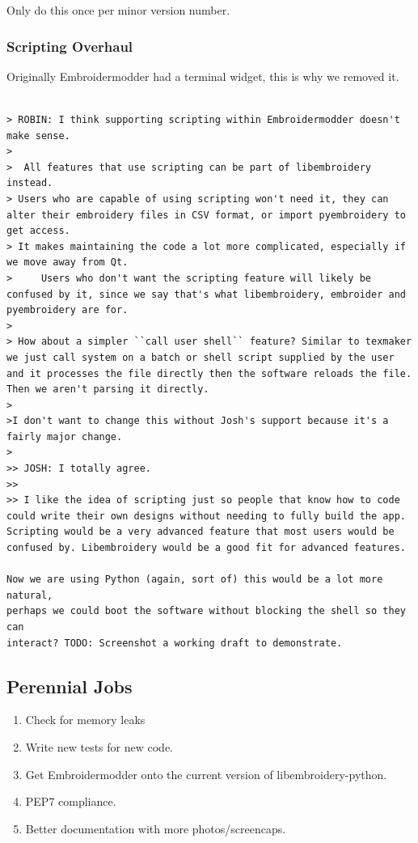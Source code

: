 \documentclass[a4paper, 11pt]{report}
\begin{document}
Only do this once per minor version number.

\subsubsection{Scripting Overhaul}

Originally Embroidermodder had a terminal widget, this is why we removed it.

\begin{verbatim}

> ROBIN: I think supporting scripting within Embroidermodder doesn't make sense.
>
>  All features that use scripting can be part of libembroidery instead.
> Users who are capable of using scripting won't need it, they can alter their embroidery files in CSV format, or import pyembroidery to get access.
> It makes maintaining the code a lot more complicated, especially if we move away from Qt.
>     Users who don't want the scripting feature will likely be confused by it, since we say that's what libembroidery, embroider and pyembroidery are for.
> 
> How about a simpler ``call user shell`` feature? Similar to texmaker we just call system on a batch or shell script supplied by the user and it processes the file directly then the software reloads the file. Then we aren't parsing it directly.
> 
>I don't want to change this without Josh's support because it's a fairly major change.
> 
>> JOSH: I totally agree.
>>
>> I like the idea of scripting just so people that know how to code could write their own designs without needing to fully build the app. Scripting would be a very advanced feature that most users would be confused by. Libembroidery would be a good fit for advanced features.

Now we are using Python (again, sort of) this would be a lot more natural,
perhaps we could boot the software without blocking the shell so they can
interact? TODO: Screenshot a working draft to demonstrate.
\end{verbatim}

\subsection{Perennial Jobs}

\begin{enumerate}
\item Check for memory leaks
\item Write new tests for new code.
\item Get Embroidermodder onto the current version of libembroidery-python.
\item PEP7 compliance.
\item Better documentation with more photos/screencaps.
\end{enumerate}
\end{document}
